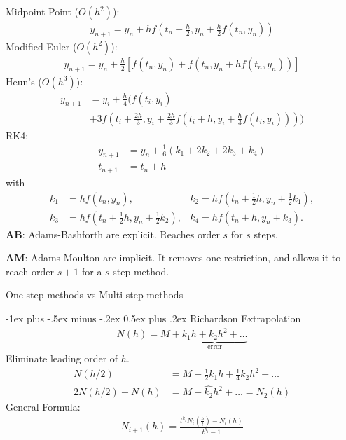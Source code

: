 \documentclass[10pt,landscape]{article}
\makeatletter
\renewcommand{\section}{\@startsection{section}{1}{0mm}%
                                {-1ex plus -.5ex minus -.2ex}%
                                {0.5ex plus .2ex}%
                                {\normalfont\large\bfseries}}
\makeatother
\begin{document}
\begin{multicols}{3}
Midpoint Point ($O(h^2)$):
\begin{align*}
  y_{n+1} = y_n + h f\left(t_n + \tfrac{h}{2}, y_n + \tfrac{h}{2} f(t_n, y_n)\right)
\end{align*}
Modified Euler ($O(h^2)$):
\begin{align*}
  y_{n+1} = y_n + \tfrac{h}{2} \left[f(t_n, y_n) + f(t_n, y_n + h f(t_n, y_n))\right]
\end{align*}
Heun's ($O(h^3)$):
\begin{align*}
  y_{n+1} &= y_i + \tfrac{h}{4}(f(t_i,y_i)\\
          &+ 3f\left(t_i + \tfrac{2h}{3}, y_i + \tfrac{2h}{3}f \left(
            t_i + h ,y_i + \tfrac{h}{3}f(t_i,y_i)\right)
          \right)
        )
\end{align*}
RK4:
\begin{align*}
y_{n+1} &= y_n + \tfrac{1}{6} \left(k_1 + 2k_2 + 2k_3 + k_4 \right)\\
t_{n+1} &= t_n + h
\end{align*} with
\begin{align*}
k_1 &= hf(t_n, y_n),
&k_2 = hf(t_n + \tfrac{1}{2}h , y_n +  \tfrac{1}{2} k_1),
\\
k_3 &= hf(t_n + \tfrac{1}{2}h , y_n +   \tfrac{1}{2} k_2), 
&k_4 = hf(t_n + h , y_n + k_3).
\end{align*}
\textbf{AB}: Adams-Bashforth are explicit. Reaches order $s$ for $s$
steps. 

\textbf{AM}: Adams-Moulton are implicit. It removes one restriction,
and allows it to reach order $s+1$ for a $s$ step method. 

One-step methods vs Multi-step methods

\section{Richardson Extrapolation}
\begin{align*}
  N(h) = M + \underbrace{k_{1}h + k_{2}h^{2} + \ldots}_{\text{error}}
\end{align*}
Eliminate leading order of $h$. 
\begin{align*}
  N(h/2) &= M + \frac{1}{2}k_{1}h + \frac{1}{4}k_{2}h^{2} + \ldots
\\
2 N(h/2) - N(h) &= M + \hat{k_{2}}h^{2} + \ldots = N_{2}(h)
\end{align*}
General Formula:
\begin{align*}
  N_{i+1}(h) = \frac{t^{k_i} N_i(\tfrac{h}{t}) - N_i(h)}{t^{k_i} - 1}
\end{align*}


\end{multicols}
\end{document}

